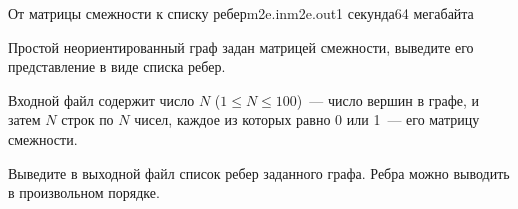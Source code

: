 \begin{problem}{От матрицы смежности к списку ребер}{m2e.in}{m2e.out}{1 секунда}{64 мегабайта}

Простой неориентированный граф задан матрицей смежности, выведите его представление в виде списка ребер.

\InputFile

Входной файл содержит число $N$ ($1 \leqslant N \leqslant 100$)~--- число
вершин в графе, и затем $N$ строк по $N$ чисел, каждое из которых
равно 0 или 1~--- его матрицу смежности.

\OutputFile

Выведите в выходной файл список ребер заданного графа. Ребра можно выводить в произвольном порядке.

\Example

\begin{example}
%
\end{example}

\end{problem}
